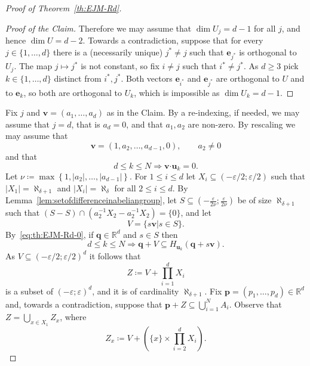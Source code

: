 \documentclass[12pt]{amsart}
\newcommand{\R}{\mathbb{R}}	%
\newcommand{\IMPLIES}{\Rightarrow }
\newcommand{\Mid}{\boldsymbol\mid}			%
\newcommand{\set}[1]{\mathopen \{ {#1} \mathclose \}} %
\newcommand{\setof}[2]{\mathopen \{{#1}\Mid{#2} \mathclose\}} %
\newcommand{\setLR}[1]{\left \{ {#1} \right \}} %
\newcommand{\card}[1]{\mathopen | #1 \mathclose |}		%
\theoremstyle{plain}
\theoremstyle{definition}
\theoremstyle{remark}
\begin{document}
\begin{proof}[Proof of Theorem~\ref{th:EJM-Rd}]
\begin{proof}[Proof of the Claim]
Therefore we may assume that \( \dim U_j = d - 1 \) for all \( j \), and hence \( \dim U = d - 2 \).
Towards a contradiction, suppose that for every \( j \in \set{ 1 , \dots , d } \) there is a (necessarily unique) \( j^* \neq j \) such that \( \mathbf{e}_{j^*} \) is orthogonal to \( U_j \).
The map \( j \mapsto j^* \) is not constant, so fix \( i \neq j \) such that \( i^* \neq j^* \).
As \( d \geq 3 \) pick \( k \in \set{ 1 , \dots , d } \) distinct from \( i^* , j^* \).
Both vectors \( \mathbf{e}_{i^*} \) and \( \mathbf{e}_{j^*} \) are orthogonal to \( U \) and to \( \mathbf{e}_k \), so both are orthogonal to \( U_k \), which is impossible as \( \dim U_k = d - 1 \).
\end{proof}

Fix \( j \) and \( \mathbf{v} = ( a_1 , \dots , a_d ) \) as in the Claim.
By a re-indexing, if needed, we may assume that \( j = d \), that is \( a_d = 0 \), and that \( a_1 , a_2 \) are non-zero.
By rescaling we may assume that 
\[
 \mathbf{v} = ( 1 , a_2 , \dots , a_{ d - 1} , 0 ) , \qquad a_2 \neq 0
\] 
and that
\begin{equation}\label{eq:th:EJM-Rd-0}
 d \leq k \leq N \IMPLIES \mathbf{v} \boldsymbol{\cdot} \mathbf{u}_k = 0 . 
\end{equation}
Let \( \nu \coloneqq \max \setLR{ 1 , \card{ a_2 } , \dots , \card{ a_{ d - 1 } } } \).
For \( 1 \leq i \leq d \) let \( X_i \subseteq ( - \varepsilon / 2 ; \varepsilon / 2 ) \) such that \( \card{ X_1 } = \aleph_{ \delta + 1} \) and \( \card{ X_i } = \aleph_ \delta \) for all \( 2 \leq i \leq d \). 
By Lemma~\ref{lem:setofdifferenceinabeliangroup}, let \( S \subseteq ( - \frac{ \varepsilon } { 2 \nu } ; \frac{ \varepsilon } { 2 \nu } ) \) be of size \( \aleph _{ \delta + 1 } \) such that \( ( S - S ) \cap ( a_2^{-1}X_2 - a_2^{-1} X_2 ) = \set{0} \), and let 
\[
 V = \setof{ s \mathbf{v} }{ s \in S } .
\]
By~\eqref{eq:th:EJM-Rd-0}, if \( \mathbf{q} \in \R^d \) and \( s \in S \) then 
\begin{equation}\label{eq:th:EJM-Rd-1}
d \leq k \leq N \IMPLIES \mathbf{q} + V \subseteq H_{\mathbf{u}_k} ( \mathbf{q} + s \mathbf{v} ) .
\end{equation}
As \( V \subseteq ( - \varepsilon / 2 ; \varepsilon / 2 )^d \) it follows that 
\[
Z \coloneqq V + \textstyle \prod_{i = 1}^d X_i
\]
is a subset of \( ( - \varepsilon ; \varepsilon )^d \), and it is of cardinality \( \aleph_{ \delta + 1 } \).
Fix \( \mathbf{p}= ( p_1 , \dots , p_d ) \in \R^d \) and, towards a contradiction, suppose that \( \mathbf{p} + Z \subseteq \bigcup_{i = 1 }^N A_i \).
Observe that \( Z = \bigcup_{ x \in X_1 } Z_x \), where 
\[ 
Z_x \coloneqq V + ( \set{x} \times \textstyle \prod_{i = 2 }^d X_i ) .
\]


\end{proof}
\end{document}
